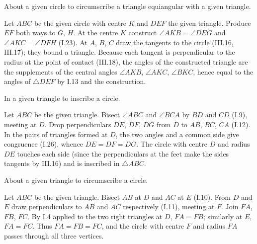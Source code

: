 \begin{claim}
\label{prop:IV.3}
About a given circle to circumscribe a triangle equiangular with a
given triangle.
\end{claim}
\begin{evidence}[Proof of IV.3]
\label{ev:IV.3}
Let $ABC$ be the given circle with centre $K$ and $DEF$ the given
triangle.  Produce $EF$ both ways to $G$, $H$.  At the centre $K$
construct $\angle AKB = \angle DEG$ and $\angle AKC = \angle DFH$
(I.23).  At $A$, $B$, $C$ draw the tangents to the circle (III.16,
III.17); they bound a triangle.  Because each tangent is perpendicular
to the radius at the point of contact (III.18), the angles of the
constructed triangle are the supplements of the central angles $\angle
AKB$, $\angle AKC$, $\angle BKC$, hence equal to the angles of
$\triangle DEF$ by I.13 and the construction.
\end{evidence}

\begin{claim}
\label{prop:IV.4}
In a given triangle to inscribe a circle.
\end{claim}
\begin{evidence}[Proof of IV.4]
\label{ev:IV.4}
Let $ABC$ be the given triangle.  Bisect $\angle ABC$ and $\angle BCA$
by $BD$ and $CD$ (I.9), meeting at $D$.  Drop perpendiculars $DE$,
$DF$, $DG$ from $D$ to $AB$, $BC$, $CA$ (I.12).  In the pairs of
triangles formed at $D$, the two angles and a common side give
congruence (I.26), whence $DE = DF = DG$.  The circle with centre $D$
and radius $DE$ touches each side (since the perpendiculars at the
feet make the sides tangents by III.16) and is inscribed in
$\triangle ABC$.
\end{evidence}

\begin{claim}
\label{prop:IV.5}
About a given triangle to circumscribe a circle.
\end{claim}
\begin{evidence}[Proof of IV.5]
\label{ev:IV.5}
Let $ABC$ be the given triangle.  Bisect $AB$ at $D$ and $AC$ at $E$
(I.10).  From $D$ and $E$ draw perpendiculars to $AB$ and $AC$
respectively (I.11), meeting at $F$.  Join $FA$, $FB$, $FC$.  By I.4
applied to the two right triangles at $D$, $FA = FB$; similarly at
$E$, $FA = FC$.  Thus $FA = FB = FC$, and the circle with centre $F$
and radius $FA$ passes through all three vertices.
\end{evidence}

